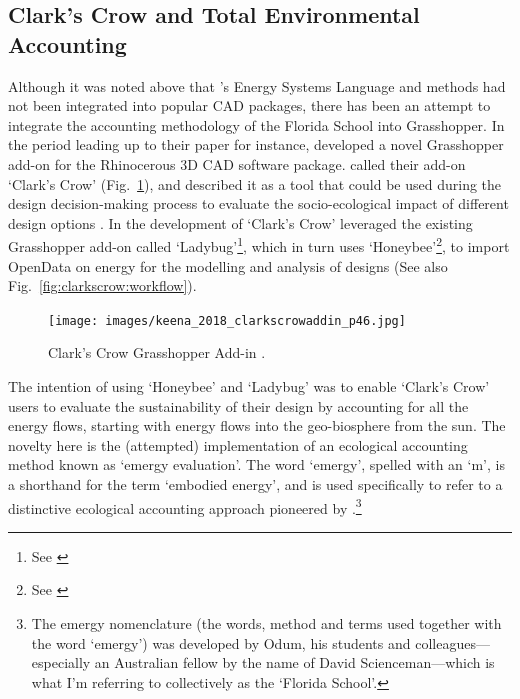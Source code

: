 

\subsection{Clark's Crow and Total Environmental Accounting}

Although it was noted above that \citeauthor{odum_ecological_1994}'s Energy Systems Language and methods had not been integrated into popular CAD packages, there has been an attempt to integrate the accounting methodology of the Florida School into Grasshopper. In the period leading up to their \citeyear{keena_clark_2018} paper for instance, \citeauthor{keena_clark_2018} developed a novel Grasshopper add-on for the Rhinocerous 3D CAD software package. \citeauthor{keena_clark_2018} called their add-on `Clark's Crow' (Fig.~\ref{fig:clarkscrow}), and described it as a tool that could be used during the design decision-making process to evaluate the socio-ecological impact of different design options \cite[pp.~42-44]{keena_clark_2018}. In the development of `Clark's Crow' \citeauthor{keena_clark_2018} leveraged the existing Grasshopper add-on called `Ladybug'\footnote{See \cite{ladybug_ladybug_2016}}, which in turn uses `Honeybee'\footnote{See \cite{ladybug_honeybee_2022}}, to import OpenData on energy for the modelling and analysis of designs (See also Fig.~\ref{fig:clarkscrow:workflow}). 

\begin{figure}[H]
    \centering
    \texttt{[image: images/keena\_2018\_clarkscrowaddin\_p46.jpg]}
    \caption{Clark's Crow Grasshopper Add-in \cite[p.~46]{keena_clark_2018}.}
    \label{fig:clarkscrow}
\end{figure}

The intention of using `Honeybee' and `Ladybug' was to enable `Clark's Crow' users to evaluate the sustainability of their design by accounting for all the energy flows, starting with energy flows into the geo-biosphere from the sun. The novelty here is the (attempted) implementation of an ecological accounting method known as `emergy evaluation'. The word `emergy', spelled with an `m', is a shorthand for the term `embodied energy', and is used specifically to refer to a distinctive ecological accounting approach pioneered by \citet{odum_environmental_1996}.\footnote{The emergy nomenclature (the words, method and terms used together with the word `emergy') was developed by Odum, his students and colleagues---especially an Australian fellow by the name of David Scienceman---which is what I'm referring to collectively as the `Florida School'.}


